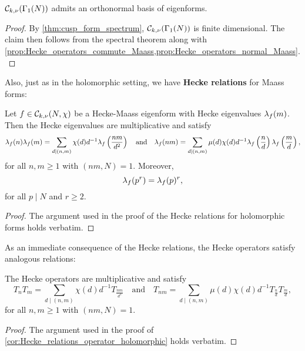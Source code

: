     \begin{theorem}\label{thm:eigenforms_forms_spectral_theory_Maass}
      $\mathcal{C}_{k,\nu}(\Gamma_{1}(N))$ admits an orthonormal basis of eigenforms.
    \end{theorem}
    \begin{proof}
      By \cref{thm:cusp_form_spectrum}, $\mathcal{C}_{k,\nu}(\Gamma_{1}(N))$ is finite dimensional. The claim then follows from the spectral theorem along with \cref{prop:Hecke_operators_commute_Maass,prop:Hecke_operators_normal_Maass}.
    \end{proof}

    Also, just as in the holomorphic setting, we have \textbf{Hecke relations} for Maass forms:

    \begin{proposition*}
      Let $f \in \mathcal{C}_{k,\nu}(N,\chi)$ be a Hecke-Maass eigenform with Hecke eigenvalues $\lambda_{f}(m)$. Then the Hecke eigenvalues are multiplicative and satisfy
      \[
        \lambda_{f}(n)\lambda_{f}(m) = \sum_{d \mid (n,m)}\chi(d)d^{-1}\lambda_{f}\left(\frac{nm}{d^{2}}\right) \quad \text{and} \quad \lambda_{f}(nm) = \sum_{d \mid (n,m)}\mu(d)\chi(d)d^{-1}\lambda_{f}\left(\frac{n}{d}\right)\lambda_{f}\left(\frac{m}{d}\right),
      \]
      for all $n,m \ge 1$ with $(nm,N) = 1$. Moreover,
      \[
        \lambda_{f}(p^{r}) = \lambda_{f}(p)^{r},
      \]
      for all $p \mid N$ and $r \ge 2$.
    \end{proposition*}
    \begin{proof}
      The argument used in the proof of the Hecke relations for holomorphic forms holds verbatim.
    \end{proof}
    
    As an immediate consequence of the Hecke relations, the Hecke operators satisfy analogous relations:

    \begin{corollary}\label{cor:Hecke_relations_operator_Maass}
      The Hecke operators are multiplicative and satisfy
      \[
        T_{n}T_{m} = \sum_{d \mid (n,m)}\chi(d)d^{-1}T_{\frac{nm}{d^{2}}} \quad \text{and} \quad T_{nm} = \sum_{d \mid (n,m)}\mu(d)\chi(d)d^{-1}T_{\frac{n}{d}}T_{\frac{m}{d}},
      \]
      for all $n,m \ge 1$ with $(nm,N) = 1$.
    \end{corollary}
    \begin{proof}
      The argument used in the proof of \cref{cor:Hecke_relations_operator_holomorphic} holds verbatim.
    \end{proof}

